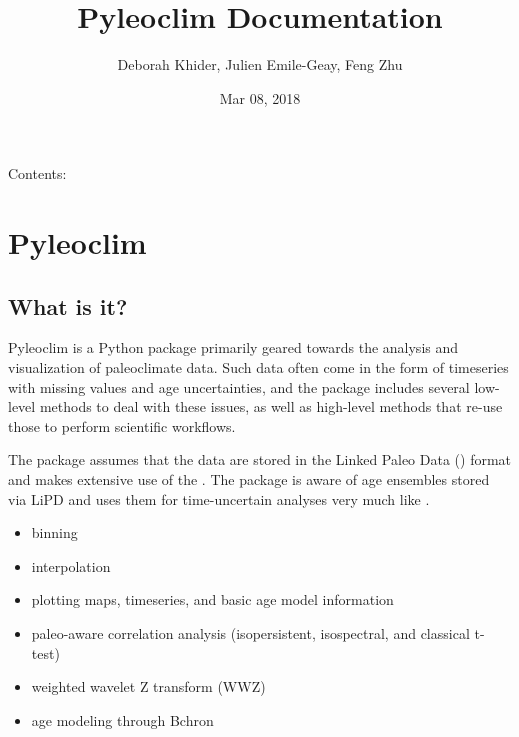 \documentclass[letterpaper,10pt,english]{sphinxmanual}
\title{Pyleoclim Documentation}
\date{Mar 08, 2018}
\author{Deborah Khider, Julien Emile-Geay, Feng Zhu}
\begin{document}
\maketitle
\sphinxtableofcontents
{}\label{\detokenize{index::doc}}


Contents:


\chapter{Pyleoclim}
\label{\detokenize{Introduction:pyleoclim}}\label{\detokenize{Introduction:welcome-to-pyleoclim-s-documentation}}\label{\detokenize{Introduction::doc}}

\section{What is it?}
\label{\detokenize{Introduction:what-is-it}}
Pyleoclim is a Python package primarily geared towards the analysis and visualization of paleoclimate data.
Such data often come in the form of timeseries with missing values and age uncertainties, and the package
includes several low-level methods to deal with these issues, as well as high-level methods that re-use those
to perform scientific workflows.

The package assumes that the data are stored in the Linked Paleo Data ()
format and makes extensive use of the . The package
is aware of age ensembles stored via LiPD and uses them for time-uncertain analyses very much like .

\begin{itemize}
\item {} 
binning

\item {} 
interpolation

\item {} 
plotting maps, timeseries, and basic age model information

\item {} 
paleo-aware correlation analysis (isopersistent, isospectral, and classical t-test)

\item {} 
weighted wavelet Z transform (WWZ)

\item {} 
age modeling through Bchron

\end{itemize}
\end{document}
